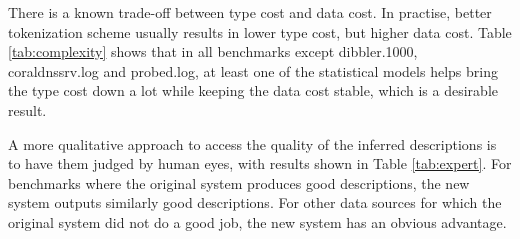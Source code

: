There is a known trade-off between type cost and data cost.
In practise, better tokenization scheme usually results in lower
type cost, but higher data cost. Table \ref{tab:complexity}
shows that in all benchmarks except dibbler.1000, coraldnssrv.log and
probed.log, at least one of the statistical models helps bring
the type cost down a lot while keeping the data cost stable, which is
a desirable result. 

A more qualitative approach to access the quality of the inferred descriptions is to
have them judged by human eyes, with results shown in Table \ref{tab:expert}.
For benchmarks where the original system produces good descriptions, 
the new system outputs similarly good descriptions. For other
data sources for which the original system did not do a good job,
the new system has an obvious advantage.

